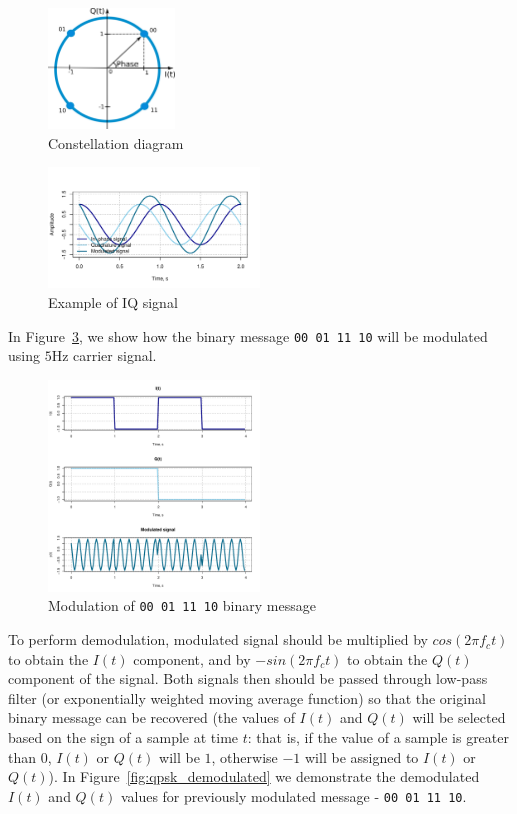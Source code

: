 \begin{figure}[ht]
\centering
\includegraphics[width=0.3\textwidth]{graphics/constellation.png}
\caption{Constellation diagram}
\label{fig:constellation}
\end{figure}

\begin{figure}[ht]
\centering
\includegraphics[width=0.5\textwidth]{graphics/iq.pdf}
\caption{Example of IQ signal}
\label{fig:iqexample}
\end{figure}

In Figure~\ref{fig:qpsk}, we show how the binary message \texttt{00 01 11 10} will 
be modulated using $5$Hz carrier signal. 

\begin{figure}[ht]
\centering
\includegraphics[width=0.5\textwidth]{graphics/qpsk.pdf}
\caption{Modulation of \texttt{00 01 11 10} binary message}
\label{fig:qpsk}
\end{figure}

To perform demodulation, modulated signal should be multiplied by $cos(2\pi f_c t)$ to obtain 
the $I(t)$ component, and by $-sin(2\pi f_c t)$ to obtain the $Q(t)$ component of the signal. 
Both signals then should be passed through low-pass filter (or exponentially weighted moving average function) 
so that the original binary message can be recovered (the values of $I(t)$ and $Q(t)$ will be selected based 
on the sign of a sample at time $t$: that is, if the value of a sample is greater than $0$, $I(t)$ or $Q(t)$ will be $1$, 
otherwise $-1$ will be assigned to $I(t)$ or $Q(t)$). In Figure~\ref{fig:qpsk_demodulated} we demonstrate the demodulated 
$I(t)$ and $Q(t)$ values for previously modulated message - \texttt{00 01 11 10}. 

